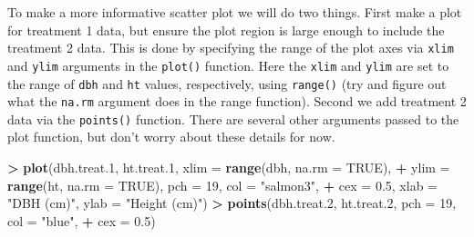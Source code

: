 \documentclass[]{krantz}
\makeatletter
\newenvironment{Shaded}{\begin{snugshade}}{\end{snugshade}}
\newcommand{\CommentTok}[1]{\textcolor[rgb]{0.37,0.37,0.37}{\textit{#1}}}
\newcommand{\DataTypeTok}[1]{\textcolor[rgb]{0.27,0.27,0.27}{#1}}
\newcommand{\DecValTok}[1]{\textcolor[rgb]{0.06,0.06,0.06}{#1}}
\newcommand{\ErrorTok}[1]{\textcolor[rgb]{0.14,0.14,0.14}{\textbf{#1}}}
\newcommand{\FloatTok}[1]{\textcolor[rgb]{0.06,0.06,0.06}{#1}}
\newcommand{\KeywordTok}[1]{\textcolor[rgb]{0.27,0.27,0.27}{\textbf{#1}}}
\newcommand{\NormalTok}[1]{#1}
\newcommand{\OperatorTok}[1]{\textcolor[rgb]{0.43,0.43,0.43}{\textbf{#1}}}
\newcommand{\OtherTok}[1]{\textcolor[rgb]{0.37,0.37,0.37}{#1}}
\newcommand{\StringTok}[1]{\textcolor[rgb]{0.5,0.5,0.5}{#1}}
\newenvironment{kframe}{%
\medskip{}
\setlength{\fboxsep}{.8em}
 \def\at@end@of@kframe{}%
 \ifinner\ifhmode%
  \def\at@end@of@kframe{\end{minipage}}%
  \begin{minipage}{\columnwidth}%
 \fi\fi%
 \def\FrameCommand##1{\hskip\@totalleftmargin \hskip-\fboxsep
 \colorbox{shadecolor}{##1}\hskip-\fboxsep
     \hskip-\linewidth \hskip-\@totalleftmargin \hskip\columnwidth}%
 \MakeFramed {\advance\hsize-\width
   \@totalleftmargin\z@ \linewidth\hsize
   \@setminipage}}%
 {\par\unskip\endMakeFramed%
 \at@end@of@kframe}
\renewenvironment{Shaded}{\begin{kframe}}{\end{kframe}}
\makeatother
\begin{document}
\begin{Shaded}
\end{Shaded}

To make a more informative scatter plot we will do two things. First make a plot for treatment 1 data, but ensure the plot region is large enough to include the treatment 2 data. This is done by specifying the range of the plot axes via \texttt{xlim} and \texttt{ylim} arguments in the \texttt{plot()} function. Here the \texttt{xlim} and \texttt{ylim} are set to the range of \texttt{dbh} and \texttt{ht} values, respectively, using \texttt{range()} (try and figure out what the \texttt{na.rm} argument does in the range function). Second we add treatment 2 data via the \texttt{points()} function. There are several other arguments passed to the plot function, but don't worry about these details for now.

\begin{Shaded}
\begin{Highlighting}[]
\OperatorTok{>}\StringTok{ }\KeywordTok{plot}\NormalTok{(dbh.treat}\FloatTok{.1}\NormalTok{, ht.treat}\FloatTok{.1}\NormalTok{, }\DataTypeTok{xlim =} \KeywordTok{range}\NormalTok{(dbh, }\DataTypeTok{na.rm =} \OtherTok{TRUE}\NormalTok{), }
\OperatorTok{+}\StringTok{   }\DataTypeTok{ylim =} \KeywordTok{range}\NormalTok{(ht, }\DataTypeTok{na.rm =} \OtherTok{TRUE}\NormalTok{), }\DataTypeTok{pch =} \DecValTok{19}\NormalTok{, }\DataTypeTok{col =} \StringTok{"salmon3"}\NormalTok{, }
\OperatorTok{+}\StringTok{   }\DataTypeTok{cex =} \FloatTok{0.5}\NormalTok{, }\DataTypeTok{xlab =} \StringTok{"DBH (cm)"}\NormalTok{, }\DataTypeTok{ylab =} \StringTok{"Height (cm)"}\NormalTok{)}
\OperatorTok{>}\StringTok{ }\KeywordTok{points}\NormalTok{(dbh.treat}\FloatTok{.2}\NormalTok{, ht.treat}\FloatTok{.2}\NormalTok{, }\DataTypeTok{pch =} \DecValTok{19}\NormalTok{, }\DataTypeTok{col =} \StringTok{"blue"}\NormalTok{, }
\OperatorTok{+}\StringTok{   }\DataTypeTok{cex =} \FloatTok{0.5}\NormalTok{)}
\end{Highlighting}
\end{Shaded}
\end{document}
